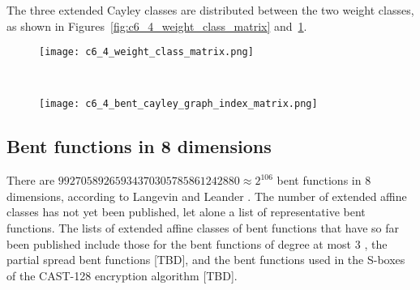 \documentclass[12pt,a4paper]{article}
\begin{document}

The three extended Cayley classes are distributed between the two weight classes,
as shown in Figures~\ref{fig:c6_4_weight_class_matrix} and~\ref{fig:c6_4_bent_cayley_graph_index_matrix}.

\begin{figure}[!hpt] %
\centering
\begin{minipage}{.48\textwidth}
  \centering
  \texttt{[image: c6\_4\_weight\_class\_matrix.png]}
  \label{fig:c6_4_weight_class_matrix}
\end{minipage}%
~~~~
\begin{minipage}{.48\textwidth}
  \centering
  \texttt{[image: c6\_4\_bent\_cayley\_graph\_index\_matrix.png]}
  \label{fig:c6_4_bent_cayley_graph_index_matrix}
\end{minipage}
\end{figure}
\subsection{Bent functions in 8 dimensions}

There are
$99 270 589 265 934 370 305 785 861 242 880 \approx 2^{106}$ bent functions in 8 dimensions,
according to Langevin and Leander \cite{LanL11counting}.
%
%
The number of extended affine classes has not yet been published,
let alone a list of representative bent functions.
The lists of extended affine classes of bent functions that have so far been published include those
for the bent functions of degree at most 3 \cite[Section 5.5.2]{Bra06thesis} \cite[Section 7.3]{Tok15bent},
the partial spread bent functions \cite{LanH11counting} [TBD],
and the bent functions used in the S-boxes of the CAST-128 encryption algorithm \cite{Ada97} [TBD].
\end{document}
